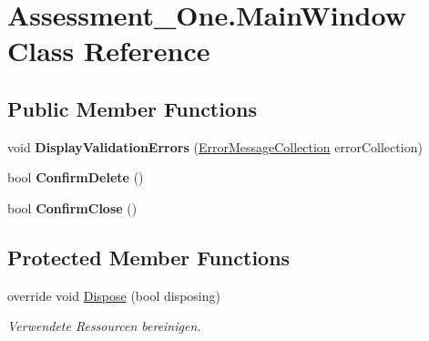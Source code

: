 \hypertarget{class_assessment___one_1_1_main_window}{
\section{Assessment\_\-One.MainWindow Class Reference}
\label{class_assessment___one_1_1_main_window}
}
\subsection*{Public Member Functions}
\begin{DoxyCompactItemize}
\item 
\hypertarget{class_assessment___one_1_1_main_window_a5ff3ffcdb63c4708067cd182c0bb1d1c}{
void {\bfseries DisplayValidationErrors} (\hyperlink{class_application_logic_1_1_model_1_1_error_message_collection}{ErrorMessageCollection} errorCollection)}
\label{class_assessment___one_1_1_main_window_a5ff3ffcdb63c4708067cd182c0bb1d1c}

\item 
\hypertarget{class_assessment___one_1_1_main_window_a5d7f03ee65a575e7b1803319e5e1c918}{
bool {\bfseries ConfirmDelete} ()}
\label{class_assessment___one_1_1_main_window_a5d7f03ee65a575e7b1803319e5e1c918}

\item 
\hypertarget{class_assessment___one_1_1_main_window_ad3a42707d1243813e45e1c0dbba4dd2c}{
bool {\bfseries ConfirmClose} ()}
\label{class_assessment___one_1_1_main_window_ad3a42707d1243813e45e1c0dbba4dd2c}

\end{DoxyCompactItemize}
\subsection*{Protected Member Functions}
\begin{DoxyCompactItemize}
\item 
override void \hyperlink{class_assessment___one_1_1_main_window_ac9ce12aeafc22da002cc8a7f8d81c965}{Dispose} (bool disposing)
\begin{DoxyCompactList}\small\item\em Verwendete Ressourcen bereinigen. \item\end{DoxyCompactList}\end{DoxyCompactItemize}
